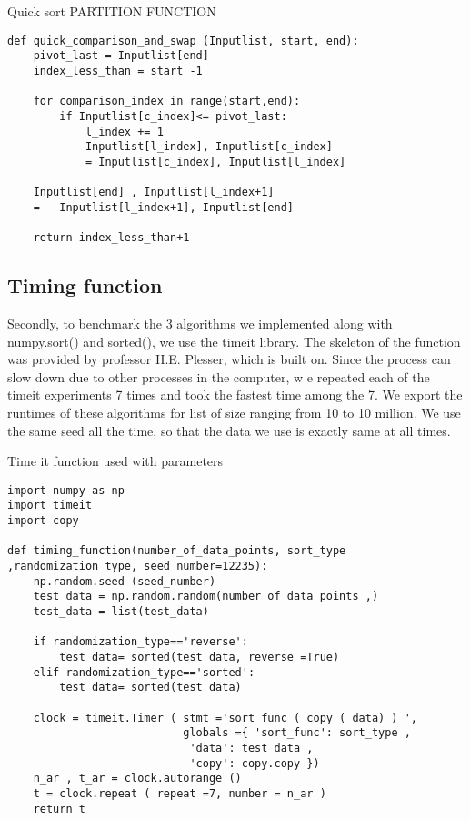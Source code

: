 \documentclass[sigconf, nonacm, natbib, screen, balance=False]{acmart}
\begin{document}
\begin{listing}
  \caption{Quick sort PARTITION FUNCTION}
  \label{lst:quick_partition}

\begin{verbatim}
def quick_comparison_and_swap (Inputlist, start, end): 
    pivot_last = Inputlist[end]
    index_less_than = start -1
    
    for comparison_index in range(start,end):
        if Inputlist[c_index]<= pivot_last:
            l_index += 1
            Inputlist[l_index], Inputlist[c_index]
            = Inputlist[c_index], Inputlist[l_index]  
            
    Inputlist[end] , Inputlist[l_index+1] 
    =   Inputlist[l_index+1], Inputlist[end]  

    return index_less_than+1  
\end{verbatim}
\end{listing}

\subsection{Timing function}\label{sec:timing function}

Secondly, to benchmark the 3 algorithms we  implemented along with numpy.sort() and sorted(), we use the timeit library. The skeleton of the 
function was provided by professor H.E. Plesser, which is built on. Since the process can slow down due to other processes in the computer, w
e repeated each of the timeit experiments 7 times and took the fastest time among the 7. We export the runtimes of these algorithms for 
list of size ranging from 10 to 10 million. We use the same seed all the time, so that the data we use is exactly same at all times.

\begin{listing}
  \caption{Time it function used with parameters}
  \label{lst:time_it function}

\begin{verbatim}
import numpy as np
import timeit
import copy

def timing_function(number_of_data_points, sort_type
,randomization_type, seed_number=12235):
    np.random.seed (seed_number)
    test_data = np.random.random(number_of_data_points ,)
    test_data = list(test_data)

    if randomization_type=='reverse':
        test_data= sorted(test_data, reverse =True)
    elif randomization_type=='sorted':
        test_data= sorted(test_data)

    clock = timeit.Timer ( stmt ='sort_func ( copy ( data) ) ', 
                           globals ={ 'sort_func': sort_type ,
                            'data': test_data ,
                            'copy': copy.copy })
    n_ar , t_ar = clock.autorange ()
    t = clock.repeat ( repeat =7, number = n_ar )
    return t
\end{verbatim}
\end{listing}
\end{document}
